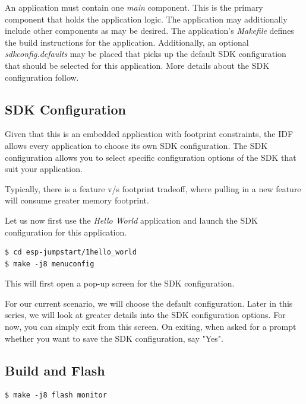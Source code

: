 \documentclass[main.tex]{subfiles}
\begin{document}
An application must contain one \textit{main} component. This is the primary component that holds the application logic. The application may additionally include other components as may be desired.
The application's \textit{Makefile} defines the build instructions for the application. 
Additionally, an optional \textit{sdkconfig.defaults} may be placed that picks up the default SDK configuration that should be selected for this application. More details about the SDK configuration follow.

\subsection{SDK Configuration}

Given that this is an embedded application with footprint constraints, the IDF allows every application to choose its own SDK configuration. The SDK configuration allows you to select specific configuration options of the SDK that suit your application.

Typically, there is a feature v/s footprint tradeoff, where pulling in a new feature will consume greater memory footprint.

Let us now first use the \textit{Hello World} application and launch the SDK configuration for this application.

\begin{verbatim}
$ cd esp-jumpstart/1hello_world
$ make -j8 menuconfig
\end{verbatim}

This will first open a pop-up screen for the SDK configuration.

For our current scenario, we will choose the default configuration. Later in this series, we will look at greater details into the SDK configuration options. For now, you can simply exit from this screen. On exiting, when asked for a prompt whether you want to save the SDK configuration, say "Yes".


\subsection{Build and Flash}
\begin{verbatim}
$ make -j8 flash monitor
\end{verbatim}
\end{document}

